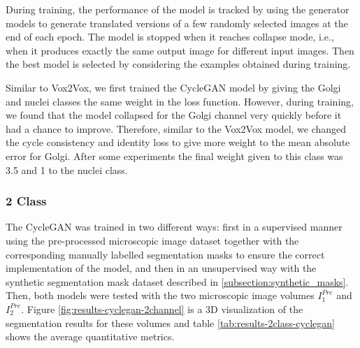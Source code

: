 During training, the performance of the model is tracked by using the generator models to generate translated versions of a few randomly selected images at the end of each epoch. The model is stopped when it reaches collapse mode, i.e., when it produces exactly the same output image for different input images. Then the best model is selected by considering the examples obtained during training.

Similar to Vox2Vox, we first trained the CycleGAN model by giving the Golgi and nuclei classes the same weight in the loss function. However, during training, we found that the model collapsed for the Golgi channel very quickly before it had a chance to improve. Therefore, similar to the Vox2Vox model, we changed the cycle consistency and identity loss to give more weight to the mean absolute error for Golgi. After some experiments the final weight given to this class was 3.5 and 1 to the nuclei class.


\subsubsection*{2 Class}

The CycleGAN was trained in two different ways: first in a supervised manner using the pre-processed microscopic image dataset together with the corresponding manually labelled segmentation masks to ensure the correct implementation of the model, and then in an unsupervised way with the synthetic segmentation mask dataset described in \ref{subsection:synthetic_masks}. Then, both models were tested with the two microscopic image volumes $I^{Pre}_1$ and $I^{Pre}_2$. Figure \ref{fig:results-cyclegan-2channel} is a 3D visualization of the segmentation results for these volumes and table \ref{tab:results-2class-cyclegan} shows the average quantitative metrics.

\begin{table}[!htb]
\centering
\caption{Average metric values obtained from training the 2 class CycleGAN model in an supervised and unsupervised way and testing these models with two microscopic images}
\label{tab:results-2class-cyclegan}
\end{table}

